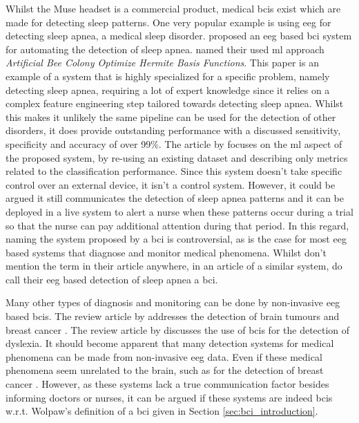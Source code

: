 Whilst the Muse headset is a commercial product, medical \glspl{bci} exist which are made for detecting sleep patterns.
One very popular example is using \gls{eeg} for detecting sleep apnea, a medical sleep disorder.
 proposed an \gls{eeg} based \gls{bci} system for automating the detection of sleep apnea.
 named their used \gls{ml} approach \textit{Artificial Bee Colony Optimize Hermite Basis Functions}.
This paper is an example of a system that is highly specialized for a specific problem, namely detecting sleep apnea, requiring a lot of expert knowledge since it relies on a complex feature engineering step tailored towards detecting sleep apnea. 
Whilst this makes it unlikely the same pipeline can be used for the detection of other disorders, it does provide outstanding performance with a discussed sensitivity, specificity and accuracy of over 99\%.
The article by \citet{eeg_sleep_apnea} focuses on the \gls{ml} aspect of the proposed system, by re-using an existing dataset and describing only metrics related to the classification performance.
Since this system doesn't take specific control over an external device, it isn't a control system.
However, it could be argued it still communicates the detection of sleep apnea patterns and it can be deployed in a live system to alert a nurse when these patterns occur during a trial so that the nurse can pay additional attention during that period.
In this regard, naming the system proposed by \citet{eeg_sleep_apnea} a \gls{bci} is controversial, as is the case for most \gls{eeg} based systems that diagnose and monitor medical phenomena. 
Whilst \citet{eeg_sleep_apnea} don't mention the term  in their article anywhere, in an article of a similar system, \citet{bci_sleep_apnea} do call their \gls{eeg} based detection of sleep apnea a \gls{bci}.

Many other types of diagnosis and monitoring can be done by non-invasive \gls{eeg} based \glspl{bci}.
The review article by \citet{bci_applications} addresses the detection of brain tumours \citep{eeg_brain_tumor1, eeg_brain_tumor2} and breast cancer \citep{eeg_breast_cancer}.
The review article by \citep{eeg_diagnosing_dyslexia} discusses the use of \glspl{bci} for the detection of dyslexia.
It should become apparent that many detection systems for medical phenomena can be made from non-invasive \gls{eeg} data. 
Even if these medical phenomena seem unrelated to the brain, such as for the detection of breast cancer \citep{eeg_breast_cancer}.
However, as these systems lack a true communication factor besides informing doctors or nurses, it can be argued if these systems are indeed \glspl{bci} w.r.t. Wolpaw's definition of a \gls{bci} given in Section \ref{sec:bci_introduction}.

